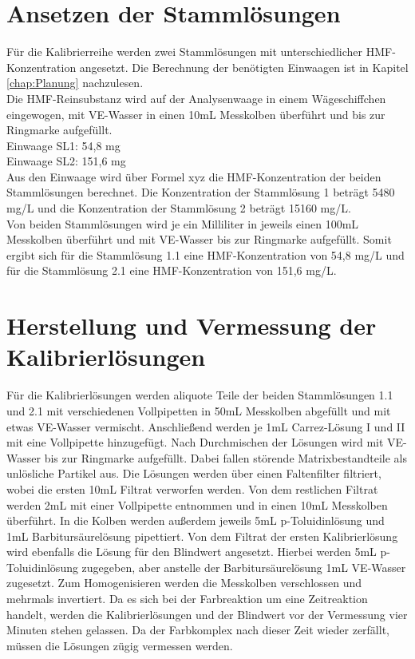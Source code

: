 \section{Ansetzen der Stammlösungen}

Für die Kalibrierreihe werden zwei Stammlösungen mit unterschiedlicher HMF-Konzentration angesetzt. Die Berechnung der benötigten Einwaagen ist in Kapitel \ref{chap:Planung} nachzulesen.\\
Die HMF-Reinsubstanz wird auf der Analysenwaage in einem Wägeschiffchen eingewogen, mit VE-Wasser in einen 10mL Messkolben überführt und bis zur Ringmarke aufgefüllt.\\

Einwaage SL1: 54,8 mg\\
Einwaage SL2: 151,6 mg\\

Aus den Einwaage wird über Formel xyz die HMF-Konzentration der beiden Stammlösungen berechnet. Die Konzentration der Stammlösung 1 beträgt 5480 mg/L und die Konzentration der Stammlösung 2 beträgt 15160 mg/L.\\ 
Von beiden Stammlösungen wird je ein Milliliter in jeweils einen 100mL Messkolben überführt und mit VE-Wasser bis zur Ringmarke aufgefüllt. Somit ergibt sich für die Stammlösung 1.1 eine HMF-Konzentration von 54,8 mg/L und für die Stammlösung 2.1 eine HMF-Konzentration von 151,6 mg/L. 

\section{Herstellung und Vermessung der Kalibrierlösungen}

Für die Kalibrierlösungen werden aliquote Teile der beiden Stammlösungen 1.1 und 2.1 mit verschiedenen Vollpipetten in 50mL Messkolben abgefüllt und mit etwas VE-Wasser vermischt. Anschließend werden je 1mL Carrez-Lösung I und II mit eine Vollpipette hinzugefügt. Nach Durchmischen der Lösungen wird mit VE-Wasser bis zur Ringmarke aufgefüllt. Dabei fallen störende Matrixbestandteile als unlösliche Partikel aus. Die Lösungen werden über einen Faltenfilter filtriert, wobei die ersten 10mL Filtrat verworfen werden. Von dem restlichen Filtrat werden 2mL mit einer Vollpipette entnommen und in einen 10mL Messkolben überführt. In die Kolben werden außerdem jeweils 5mL p-Toluidinlösung und 1mL Barbitursäurelösung pipettiert. Von dem Filtrat der ersten Kalibrierlösung wird ebenfalls die Lösung für den Blindwert angesetzt. Hierbei werden 5mL p-Toluidinlösung zugegeben, aber anstelle der Barbitursäurelösung 1mL VE-Wasser zugesetzt. Zum Homogenisieren werden die Messkolben verschlossen und mehrmals invertiert. Da es sich bei der Farbreaktion um eine Zeitreaktion handelt, werden die Kalibrierlösungen und der Blindwert vor der Vermessung vier Minuten stehen gelassen. Da der Farbkomplex nach dieser Zeit wieder zerfällt, müssen die Lösungen zügig vermessen werden.

